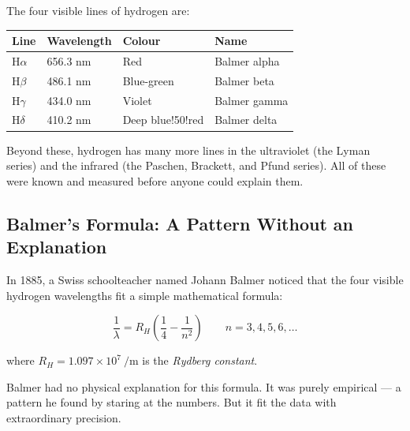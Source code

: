 \documentclass[12pt, a4paper]{book}
\newcommand{\newterm}[1]{\textit{\textcolor{DiscoveryColor}{#1}}}
\begin{document}
\vspace{0.8em}

The four visible lines of hydrogen are:
\begin{center}
\begin{tabular}{llll}
\toprule
Line & Wavelength & Colour & Name \\
\midrule
H$\alpha$ & 656.3 nm & Red       & Balmer alpha \\
H$\beta$  & 486.1 nm & Blue-green & Balmer beta \\
H$\gamma$ & 434.0 nm & Violet    & Balmer gamma \\
H$\delta$ & 410.2 nm & Deep blue!50!red & Balmer delta \\
\bottomrule
\end{tabular}
\end{center}

Beyond these, hydrogen has many more lines in the ultraviolet
(the Lyman series) and the infrared (the Paschen, Brackett,
and Pfund series).
All of these were known and measured before anyone could
explain them.

\subsection{Balmer's Formula: A Pattern Without an Explanation}

In 1885, a Swiss schoolteacher named Johann Balmer noticed
that the four visible hydrogen wavelengths fit a simple
mathematical formula:

\[
  \frac{1}{\lambda} = R_H \left(\frac{1}{4} - \frac{1}{n^2}\right)
  \qquad n = 3, 4, 5, 6, \ldots
\]

where $R_H = 1.097 \times 10^7\ \si{\per\metre}$ is the
\newterm{Rydberg constant}.

Balmer had no physical explanation for this formula.
It was purely empirical --- a pattern he found by staring
at the numbers.
But it fit the data with extraordinary precision.
\end{document}
